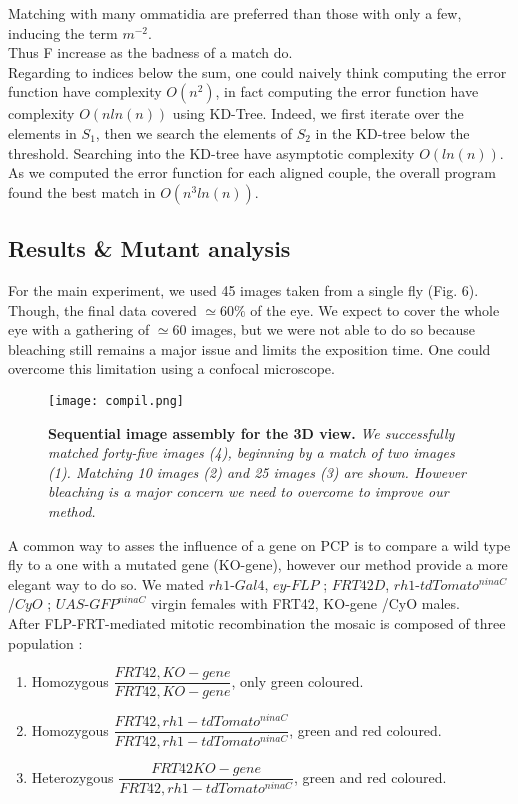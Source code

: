 \documentclass{article}
\begin{document}
 Matching with many ommatidia are preferred than those with only a few, inducing the term $ m^{-2} $.
 \\
 Thus F increase as the badness of a match do.
 \\
 Regarding to indices below the sum, one could naively think computing the error function have complexity $O(n^{2})$, in fact computing the error function have complexity $O(nln(n))$ using KD-Tree. Indeed, we first iterate over the elements in $ S_{1} $, then we search the elements of $S_{2}$ in the KD-tree below the threshold. Searching into the KD-tree have asymptotic complexity $O(ln(n))$. \\
 As we computed the error function for each aligned couple, the overall program found the best match in $O(n^{3}ln(n))$.

\subsection{Results \& Mutant analysis}
For the main experiment, we used 45 images taken from a single fly (Fig. 6). Though, the final data covered $\simeq 60 \% $ of the eye. We expect to cover the whole eye with a gathering of $\simeq 60$ images, but we were not able to do so because bleaching still remains a major issue and limits the exposition time. One could overcome this limitation using a confocal microscope. 
\begin{figure}[H]
	  \centering
  	\texttt{[image: compil.png]}
  	\caption{\textbf{Sequential image assembly for the 3D view.} \textsl{We successfully matched forty-five images (4), beginning by a match of two images (1). Matching 10 images (2) and 25 images (3) are shown. However bleaching is a major concern we need to overcome to improve our method.}}
	\end{figure}
A common way to asses the influence of a gene on PCP is to compare a wild type fly to a one with a mutated gene (KO-gene), however our method provide a more elegant way to do so. We mated $rh1$-$Gal4$, $ey$-$FLP$ ; $FRT42D$, $rh1$-$tdTomato^{ninaC}$/$CyO$ ; $UAS$-$GFP^{ninaC}$ virgin females with FRT42, KO-gene /CyO males.
\\ After FLP-FRT-mediated mitotic recombination the mosaic is composed of three population :
\begin{enumerate}
		\item{Homozygous $ \dfrac{FRT42, KO-gene}{FRT42, KO-gene} $, only green coloured.}
		\item{Homozygous $ \dfrac{FRT42, rh1-tdTomato^{ninaC}}{FRT42, rh1-tdTomato^{ninaC}} $, green and red coloured.}
		\item{Heterozygous $ \dfrac{FRT42 KO-gene}{FRT42, rh1-tdTomato^{ninaC}} $, green and red coloured.}
\end{enumerate}
\end{document}
